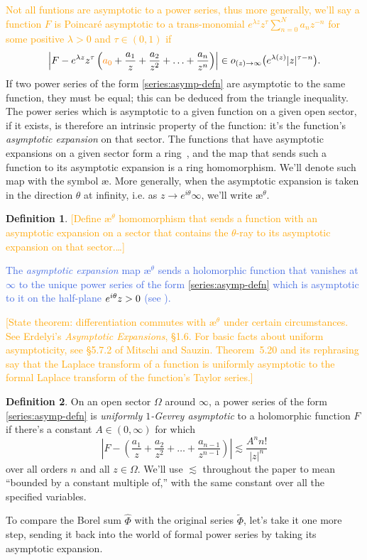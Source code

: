 \documentclass{article}
\let\Re\relax
\DeclareMathOperator{\Re}{Re}
\newcommand{\series}[1]{\tilde{#1}}
\newcommand{\aexp}{\text{\ae}}
\theoremstyle{definition}
\newtheorem{defn}{Definition}
\theoremstyle{plain}
\begin{document}
\textcolor{orange}{Not all funtions are asymptotic to a power series, thus more generally, we'll say a function $F$ is Poincar\'e asymptotic to a trans-monomial $e^{\lambda z}z^\tau\sum_{n=0}^Na_nz^{-n}$ for some positive $\lambda>0$ and $\tau\in(0,1)$ if 
\[\left|F - e^{\lambda z}z^{\tau}\left(\textcolor{orange}{a_0}+\frac{a_1}{z} + \frac{a_2}{z^2} + \ldots + \frac{a_n}{z^n} \right) \right| \in o_{\Re(z) \to \infty}\big(e^{\lambda\Re(z)}|z|^{\tau-n}\big).\]}
If two power series of the form \eqref{series:asymp-defn} are asymptotic to the same function, they must be equal; this can be deduced from the triangle inequality. The power series which is asymptotic to a given function on a given open sector, if it exists, is therefore an intrinsic property of the function: it's the function's {\em asymptotic expansion} on that sector. The functions that have asymptotic expansions on a given sector form a ring~\cite[Section~A.4]{nikolaev2023existence}, and the map that sends such a function to its asymptotic expansion is a ring homomorphism. We'll denote such map with the symbol $\aexp$. More generally, when the asymptotic expansion is taken in the direction $\theta$ at infinity, i.e. as $z\to e^{i\theta}\infty$, we'll write $\aexp^\theta$.  

\begin{defn}
\textcolor{orange}{[Define $\aexp^\theta$ homomorphism that sends a function with an asymptotic expansion on a sector that contains the $\theta$-ray to its asymptotic expansion on that sector.\ldots]}
\end{defn}
\textcolor{RoyalBlue}{The {\em asymptotic expansion} map $\aexp^\theta$ sends a holomorphic function that vanishes at $\infty$ to the unique power series of the form \eqref{series:asymp-defn} which is asymptotic to it on the half-plane $\Re e^{i\theta}z > 0$ (see \cite[Theorem~C.11]{nikolaev2023existence}).}

\textcolor{orange}{[State theorem: differentiation commutes with $\aexp^\theta$ under certain circumstances. See Erdelyi's {\em Asymptotic Expansions}, \S 1.6. For basic facts about uniform asymptoticity, see \S 5.7.2 of Mitschi and Sauzin. Theorem~5.20 and its rephrasing say that the Laplace transform of a function is uniformly asymptotic to the formal Laplace transform of the function's Taylor series.]}

\begin{defn}\label{def:unif-gevrey-asymp}
On an open sector $\Omega$ around $\infty$, a power series of the form \eqref{series:asymp-defn} is {\em uniformly $1$-Gevrey asymptotic} to a holomorphic function $F$ if there's a constant $A \in (0, \infty)$ for which
\[ \left|F - \left(\frac{a_1}{z} + \frac{a_2}{z^2} + \ldots + \frac{a_{n-1}}{z^{n-1}} \right) \right| \lesssim \frac{A^n n!}{|z|^n} \]
over all orders $n$ and all $z \in \Omega$. We'll use $\lesssim$ throughout the paper to mean ``bounded by a constant multiple of,'' with the same constant over all the specified variables.
\end{defn}
To compare the Borel sum $\hat{\Phi}$ with the original series $\series{\Phi}$, let's take it one more step, sending it back into the world of formal power series by taking its asymptotic expansion.
\end{document}
